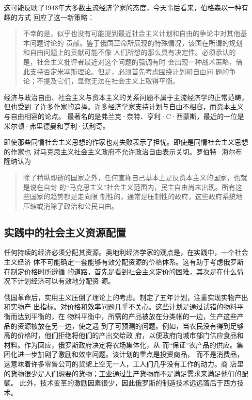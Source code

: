 这可能反映了1948年大多数主流经济学家的态度，今天事后看来，伯格森以一种有趣的方式
回应了这一新策略：

\begin{quotation}
  不幸的是，似乎也没有可能提到最近社会主义计划和自由的争论中对其他基本问题讨论的
  贡献。鉴于俄国革命所展现的特殊情况，该国在所谓的规划和自由问题上的贡献可能不像
  人们所想的那么具有决定性。必须承认的是，社会主义批评者最近对这个问题的强调有时
  会出现一种战术策略，借此支持否定米塞斯理论。但是，必须首先考虑围绕计划和自由问
  题的争论；不提及它们，显然无法在社会主义上取得平衡。
\end{quotation}

经济与政治自由、社会主义与资本主义的关系问题不属于主流经济学的正常范畴，但也受到
了许多作家的追捧。许多经济学家支持计划与自由不相容，而资本主义与自由相容的论点。
最著名的是弗兰克·奈特、亨利·C·西蒙斯，最近的一位是米尔顿·弗里德曼和亨利·沃利奇。

即使那些同情社会主义思想的作家也对失败表示了担忧。即使是同情社会主义思想的作家也
对马克思主义社会主义政府不允许政治自由表示关切。罗伯特·海尔布隆纳认为
\begin{quotation}
  除了稍纵即逝的国家之外，任何宣称自己基本上是反资本主义的国家，也就是说在自封
  的“马克思主义”社会主义范围内，民主自由尚未出现。所有这些国家的趋势都是走向限
  制性的，通常是压制性的政府，这些政府系统地压缩或消除了政治和公民自由。
\end{quotation}

\subsection{实践中的社会主义资源配置}

任何持续的经济必须分配其资源。奥地利经济学家的观点是，在实践中，一个社会主义经济
体不可能确定一套能够有效分配资源的价格体系。这有助于考虑俄罗斯在制定价格时所遵循
的道路，首先是看到社会主义定价的困难，其次是在什么情况下计划经济可以有效地分配资
源。

俄国革命后，实用主义压倒了理论上的考虑。制定了五年计划，注重实现实物产出和实物产
出指标。对价格和效率问题几乎不关心。这些计划是通过试错的物料平衡而达到平衡的，在
物料平衡中，所需的产品被放在分类帐的一边，生产这些产品的资源被放在另一边，使之遇
到了可预测的问题。例如，当农民没有得到足够高的价格时，他们拒绝将他们的产出交给政
府，以便政府向城市部门供应食品和材料。作为回应，俄罗斯政府决定将农场集体化，从
而“保证”农产品的供应。集团化进一步加剧了激励和效率问题。该计划的重点是投资商品，
而不是消费品，这意味着许多零售公司的货架上空无一人，工人们几乎没有工作的动力。商
店里的货物很少是人们想要的货物；工业通过生产货物而不是满足需求来满足他们的配额。
此外，技术变革的激励因素很少，因此俄罗斯的制造技术远远落后于西方技术。

